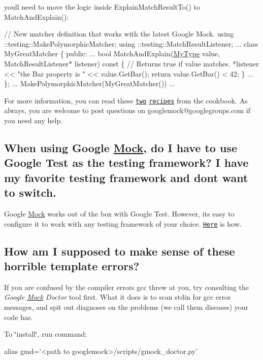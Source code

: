you\textquotesingle{}ll need to move the logic inside {\ttfamily Explain\+Match\+Result\+To()} to {\ttfamily Match\+And\+Explain()}\+: 
\begin{DoxyCode}
\textcolor{comment}{// New matcher definition that works with the latest Google Mock.}
using ::testing::MakePolymorphicMatcher;
using ::testing::MatchResultListener;
...
class MyGreatMatcher \{
 \textcolor{keyword}{public}:
  ...
  \textcolor{keywordtype}{bool} MatchAndExplain(\hyperlink{classMyType}{MyType} value,
                       MatchResultListener* listener)\textcolor{keyword}{ const }\{
    \textcolor{comment}{// Returns true if value matches.}
    *listener << \textcolor{stringliteral}{"the Bar property is "} << value.GetBar();
    \textcolor{keywordflow}{return} value.GetBar() < 42;
  \}
  ...
\};
... MakePolymorphicMatcher(MyGreatMatcher()) ...
\end{DoxyCode}


For more information, you can read these \href{CookBook.md#writing-new-monomorphic-matchers}{\tt two} \href{CookBook.md#writing-new-polymorphic-matchers}{\tt recipes} from the cookbook. As always, you are welcome to post questions on {\ttfamily googlemock@googlegroups.\+com} if you need any help.

\subsection*{When using Google \hyperlink{classMock}{Mock}, do I have to use Google Test as the testing framework? I have my favorite testing framework and don\textquotesingle{}t want to switch.}

Google \hyperlink{classMock}{Mock} works out of the box with Google Test. However, it\textquotesingle{}s easy to configure it to work with any testing framework of your choice. \href{ForDummies.md#using-google-mock-with-any-testing-framework}{\tt Here} is how.

\subsection*{How am I supposed to make sense of these horrible template errors?}

If you are confused by the compiler errors gcc threw at you, try consulting the {\itshape Google \hyperlink{classMock}{Mock} Doctor} tool first. What it does is to scan stdin for gcc error messages, and spit out diagnoses on the problems (we call them diseases) your code has.

To \char`\"{}install\char`\"{}, run command\+: 
\begin{DoxyCode}
alias gmd='<path to googlemock>/scripts/gmock\_doctor.py'
\end{DoxyCode}


